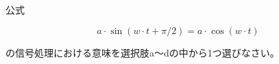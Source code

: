 公式

\[
a \cdot \sin( w\cdot t + \pi/2) = a \cdot \cos( w\cdot t )
\]

\noindent の信号処理における意味を選択肢a〜dの中から1つ選びなさい。
